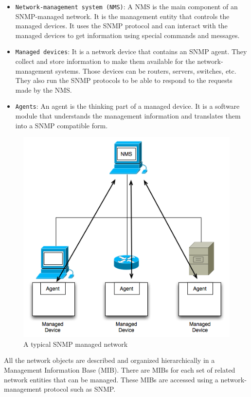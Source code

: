 \begin{itemize}
	\item \texttt{Network-management system (NMS)}: A NMS is the main component of an SNMP-managed network. It is the management entity that controls the managed devices. It uses the SNMP protocol and can interact with the managed devices to get information using special commands and messages.
	
	\item \texttt{Managed devices}: It is a network device that contains an SNMP agent. They collect and store information to make them available for the network-management systems. Those devices can be routers, servers, switches, etc. They also run the SNMP protocols to be able to respond to the requests made by the NMS.
	
	\item \texttt{Agents}: An agent is the thinking part of a managed device. It is a software module that understands the management information and translates them into a SNMP compatible form.
\end{itemize}

\begin{figure}[H]
\centering
	\includegraphics[width=.7\linewidth]{Pictures/chapter2/snmp.png}
	\caption{A typical SNMP managed network}
\end{figure}

All the network objects are described and organized hierarchically in a Management Information Base (MIB). There are MIBs for each set of related network entities that can be managed. These MIBs are accessed using a network-management protocol such as SNMP.



